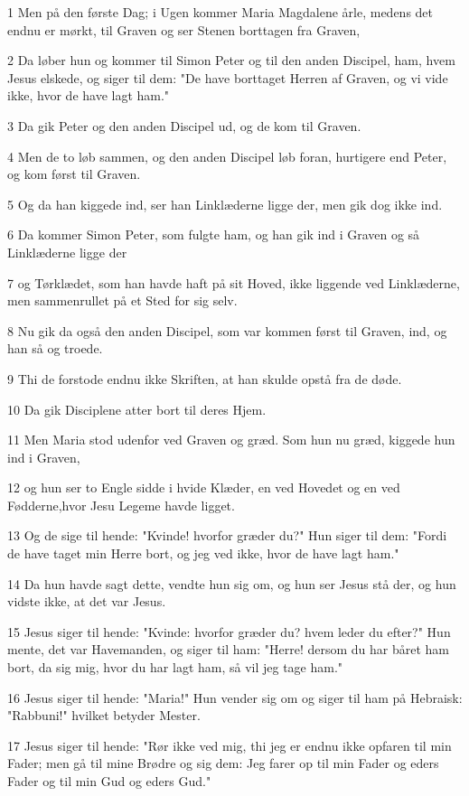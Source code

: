 \par 1 Men på den første Dag; i Ugen kommer Maria Magdalene årle, medens det endnu er mørkt, til Graven og ser Stenen borttagen fra Graven,
\par 2 Da løber hun og kommer til Simon Peter og til den anden Discipel, ham, hvem Jesus elskede, og siger til dem: "De have borttaget Herren af Graven, og vi vide ikke, hvor de have lagt ham."
\par 3 Da gik Peter og den anden Discipel ud, og de kom til Graven.
\par 4 Men de to løb sammen, og den anden Discipel løb foran, hurtigere end Peter, og kom først til Graven.
\par 5 Og da han kiggede ind, ser han Linklæderne ligge der, men gik dog ikke ind.
\par 6 Da kommer Simon Peter, som fulgte ham, og han gik ind i Graven og så Linklæderne ligge der
\par 7 og Tørklædet, som han havde haft på sit Hoved, ikke liggende ved Linklæderne, men sammenrullet på et Sted for sig selv.
\par 8 Nu gik da også den anden Discipel, som var kommen først til Graven, ind, og han så og troede.
\par 9 Thi de forstode endnu ikke Skriften, at han skulde opstå fra de døde.
\par 10 Da gik Disciplene atter bort til deres Hjem.
\par 11 Men Maria stod udenfor ved Graven og græd. Som hun nu græd, kiggede hun ind i Graven,
\par 12 og hun ser to Engle sidde i hvide Klæder, en ved Hovedet og en ved Fødderne,hvor Jesu Legeme havde ligget.
\par 13 Og de sige til hende: "Kvinde! hvorfor græder du?" Hun siger til dem: "Fordi de have taget min Herre bort, og jeg ved ikke, hvor de have lagt ham."
\par 14 Da hun havde sagt dette, vendte hun sig om, og hun ser Jesus stå der, og hun vidste ikke, at det var Jesus.
\par 15 Jesus siger til hende: "Kvinde: hvorfor græder du? hvem leder du efter?" Hun mente, det var Havemanden, og siger til ham: "Herre! dersom du har båret ham bort, da sig mig, hvor du har lagt ham, så vil jeg tage ham."
\par 16 Jesus siger til hende: "Maria!" Hun vender sig om og siger til ham på Hebraisk: "Rabbuni!" hvilket betyder Mester.
\par 17 Jesus siger til hende: "Rør ikke ved mig, thi jeg er endnu ikke opfaren til min Fader; men gå til mine Brødre og sig dem: Jeg farer op til min Fader og eders Fader og til min Gud og eders Gud."
